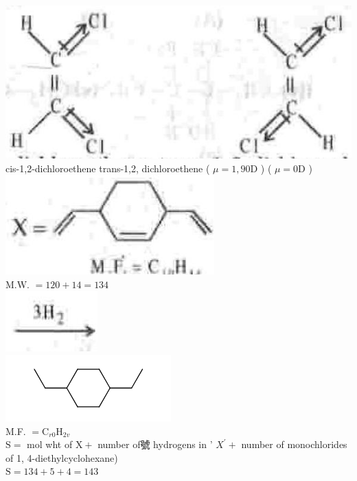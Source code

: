 \documentclass[10pt]{article}
\begin{document}
\includegraphics[max width=\textwidth, center]{2025_01_28_8470952b98110cec3aabg-248(2)}\\
cis-1,2-dichloroethene trans-1,2, dichloroethene ( $\mu=1,90 \mathrm{D}$ ) ( $\mu=0 \mathrm{D}$ )\\
\includegraphics[max width=\textwidth, center]{2025_01_28_8470952b98110cec3aabg-248(5)}\\
M.W. $=120+14=134$\\
\includegraphics[max width=\textwidth, center]{2025_01_28_8470952b98110cec3aabg-248(1)}\\
\includegraphics{smile-55984fd4ececf84e77998ae030d3947d9ade27f9}\\
M.F. $=\mathrm{C}_{r 0} \mathrm{H}_{2 v}$\\
$\mathrm{S}=$ mol wht of $\mathrm{X}+$ number of號 hydrogens in ' $X^{\prime}+$ number of monochlorides of 1, 4-diethylcyclohexane)\\
$\mathrm{S}=134+5+4=143$
\end{document}
